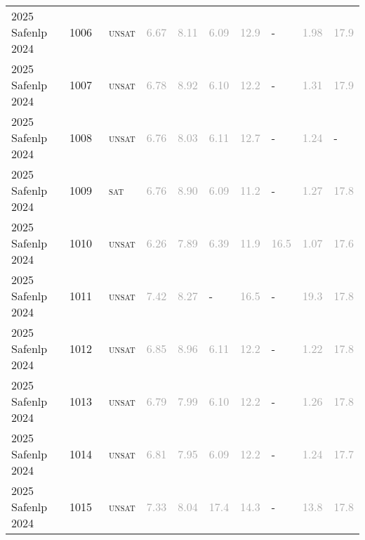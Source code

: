 \begin{center}
{\begin{longtable}{@{}llllllllll@{}}
2025 Safenlp 2024 & 1006 & ~\textsc{unsat} & \textcolor{darkgray}{6.67} & \textcolor{darkgray}{8.11} & \textcolor{darkgray}{6.09} & \textcolor{darkgray}{12.9} & - & \textcolor{darkgray}{1.98} & \textcolor{darkgray}{17.9} \\
2025 Safenlp 2024 & 1007 & ~\textsc{unsat} & \textcolor{darkgray}{6.78} & \textcolor{darkgray}{8.92} & \textcolor{darkgray}{6.10} & \textcolor{darkgray}{12.2} & - & \textcolor{darkgray}{1.31} & \textcolor{darkgray}{17.9} \\
2025 Safenlp 2024 & 1008 & ~\textsc{unsat} & \textcolor{darkgray}{6.76} & \textcolor{darkgray}{8.03} & \textcolor{darkgray}{6.11} & \textcolor{darkgray}{12.7} & - & \textcolor{darkgray}{1.24} & - \\
2025 Safenlp 2024 & 1009 & ~\textsc{sat} & \textcolor{darkgray}{6.76} & \textcolor{darkgray}{8.90} & \textcolor{darkgray}{6.09} & \textcolor{darkgray}{11.2} & - & \textcolor{darkgray}{1.27} & \textcolor{darkgray}{17.8} \\
2025 Safenlp 2024 & 1010 & ~\textsc{unsat} & \textcolor{darkgray}{6.26} & \textcolor{darkgray}{7.89} & \textcolor{darkgray}{6.39} & \textcolor{darkgray}{11.9} & \textcolor{darkgray}{16.5} & \textcolor{darkgray}{1.07} & \textcolor{darkgray}{17.6} \\
2025 Safenlp 2024 & 1011 & ~\textsc{unsat} & \textcolor{darkgray}{7.42} & \textcolor{darkgray}{8.27} & - & \textcolor{darkgray}{16.5} & - & \textcolor{darkgray}{19.3} & \textcolor{darkgray}{17.8} \\
2025 Safenlp 2024 & 1012 & ~\textsc{unsat} & \textcolor{darkgray}{6.85} & \textcolor{darkgray}{8.96} & \textcolor{darkgray}{6.11} & \textcolor{darkgray}{12.2} & - & \textcolor{darkgray}{1.22} & \textcolor{darkgray}{17.8} \\
2025 Safenlp 2024 & 1013 & ~\textsc{unsat} & \textcolor{darkgray}{6.79} & \textcolor{darkgray}{7.99} & \textcolor{darkgray}{6.10} & \textcolor{darkgray}{12.2} & - & \textcolor{darkgray}{1.26} & \textcolor{darkgray}{17.8} \\
2025 Safenlp 2024 & 1014 & ~\textsc{unsat} & \textcolor{darkgray}{6.81} & \textcolor{darkgray}{7.95} & \textcolor{darkgray}{6.09} & \textcolor{darkgray}{12.2} & - & \textcolor{darkgray}{1.24} & \textcolor{darkgray}{17.7} \\
2025 Safenlp 2024 & 1015 & ~\textsc{unsat} & \textcolor{darkgray}{7.33} & \textcolor{darkgray}{8.04} & \textcolor{darkgray}{17.4} & \textcolor{darkgray}{14.3} & - & \textcolor{darkgray}{13.8} & \textcolor{darkgray}{17.8} \\

\end{longtable}}
\end{center}
